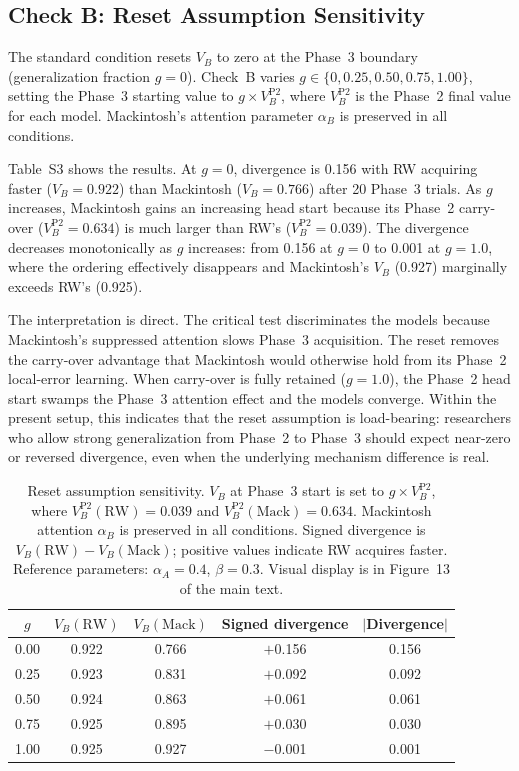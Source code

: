 \documentclass[11pt,a4paper]{article}
\begin{document}
\subsection{Check B: Reset Assumption Sensitivity}
\label{sec:s2b}

The standard condition resets $V_B$ to zero at the Phase~3 boundary (generalization fraction $g = 0$). Check~B varies $g \in \{0, 0.25, 0.50, 0.75, 1.00\}$, setting the Phase~3 starting value to $g \times V_B^{\text{P2}}$, where $V_B^{\text{P2}}$ is the Phase~2 final value for each model. Mackintosh's attention parameter $\alpha_B$ is preserved in all conditions.

Table~S3 shows the results. At $g = 0$, divergence is 0.156 with RW acquiring faster ($V_B = 0.922$) than Mackintosh ($V_B = 0.766$) after 20 Phase~3 trials. As $g$ increases, Mackintosh gains an increasing head start because its Phase~2 carry-over ($V_B^{\text{P2}} = 0.634$) is much larger than RW's ($V_B^{\text{P2}} = 0.039$). The divergence decreases monotonically as $g$ increases: from 0.156 at $g = 0$ to 0.001 at $g = 1.0$, where the ordering effectively disappears and Mackintosh's $V_B$ (0.927) marginally exceeds RW's (0.925).

The interpretation is direct. The critical test discriminates the models because Mackintosh's suppressed attention slows Phase~3 acquisition. The reset removes the carry-over advantage that Mackintosh would otherwise hold from its Phase~2 local-error learning. When carry-over is fully retained ($g = 1.0$), the Phase~2 head start swamps the Phase~3 attention effect and the models converge. Within the present setup, this indicates that the reset assumption is load-bearing: researchers who allow strong generalization from Phase~2 to Phase~3 should expect near-zero or reversed divergence, even when the underlying mechanism difference is real.

\begin{table}[htbp]
\centering
\small
\caption{Reset assumption sensitivity. $V_B$ at Phase~3 start is set to $g \times V_B^{\text{P2}}$, where $V_B^{\text{P2}}(\text{RW}) = 0.039$ and $V_B^{\text{P2}}(\text{Mack}) = 0.634$. Mackintosh attention $\alpha_B$ is preserved in all conditions. Signed divergence is $V_B(\text{RW}) - V_B(\text{Mack})$; positive values indicate RW acquires faster. Reference parameters: $\alpha_A = 0.4$, $\beta = 0.3$. Visual display is in Figure~13 of the main text.}
\label{tab:s3_reset}
\begin{tabular}{ccccc}
\toprule
$g$ & $V_B(\text{RW})$ & $V_B(\text{Mack})$ & Signed divergence & $|$Divergence$|$ \\
\midrule
0.00 & 0.922 & 0.766 & $+$0.156 & 0.156 \\
0.25 & 0.923 & 0.831 & $+$0.092 & 0.092 \\
0.50 & 0.924 & 0.863 & $+$0.061 & 0.061 \\
0.75 & 0.925 & 0.895 & $+$0.030 & 0.030 \\
1.00 & 0.925 & 0.927 & $-$0.001 & 0.001 \\
\bottomrule
\end{tabular}
\end{table}
\end{document}
